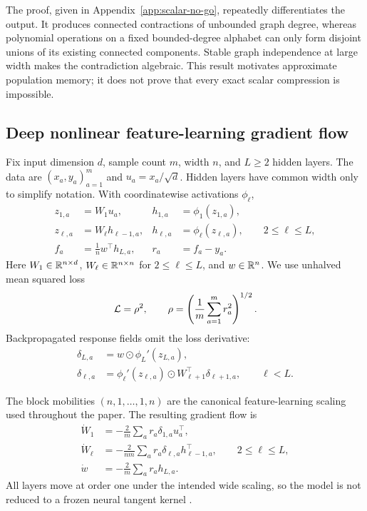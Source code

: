 The proof, given in Appendix~\ref{app:scalar-no-go}, repeatedly differentiates
the output.  It produces connected contractions of unbounded graph degree,
whereas polynomial operations on a fixed bounded-degree alphabet can only
form disjoint unions of its existing connected components.  Stable graph
independence at large width makes the contradiction algebraic.  This result
motivates approximate population memory; it does not prove that every exact
scalar compression is impossible.

\subsection{Deep nonlinear feature-learning gradient flow}

Fix input dimension $d$, sample count $m$, width $n$, and $L\ge2$ hidden
layers.  The data are $(x_a,y_a)_{a=1}^m$ and $u_a=x_a/\sqrt d$.  Hidden
layers have common width only to simplify notation.  With coordinatewise
activations $\phi_\ell$,
\begin{align}
z_{1,a}&=W_1u_a, & h_{1,a}&=\phi_1(z_{1,a}),\nonumber\\
z_{\ell,a}&=W_\ell h_{\ell-1,a}, &
h_{\ell,a}&=\phi_\ell(z_{\ell,a}),\qquad 2\le\ell\le L,\label{eq:model-forward}\\
f_a&=\frac1n w^\top h_{L,a}, & r_a&=f_a-y_a .\nonumber
\end{align}
Here $W_1\in\mathbb R^{n\times d}$, $W_\ell\in\mathbb R^{n\times n}$ for
$2\le\ell\le L$, and $w\in\mathbb R^n$.  We use unhalved mean squared loss
\begin{equation}
 \mathcal L=\rho^2,\qquad
 \rho=\left(\frac1m\sum_{a=1}^m r_a^2\right)^{1/2}.
 \label{eq:loss}
\end{equation}
Backpropagated response fields omit the loss derivative:
\begin{align}
\delta_{L,a}&=w\odot\phi_L'(z_{L,a}),\nonumber\\
\delta_{\ell,a}&=\phi_\ell'(z_{\ell,a})\odot
 W_{\ell+1}^\top\delta_{\ell+1,a},\qquad \ell<L .
\label{eq:backward}
\end{align}

The block mobilities $(n,1,\ldots,1,n)$ are the canonical
feature-learning scaling used throughout the paper.  The resulting gradient
flow is
\begin{align}
\dot W_1&=-\frac2m\sum_a r_a\delta_{1,a}u_a^\top,\nonumber\\
\dot W_\ell&=-\frac{2}{nm}\sum_a
 r_a\delta_{\ell,a}h_{\ell-1,a}^\top,
 \qquad 2\le\ell\le L,\label{eq:dense-gf}\\
\dot w&=-\frac2m\sum_a r_a h_{L,a}.\nonumber
\end{align}
All layers move at order one under the intended wide scaling, so the model is
not reduced to a frozen neural tangent kernel \citep{jacot2018ntk,yang2021tensor}.

